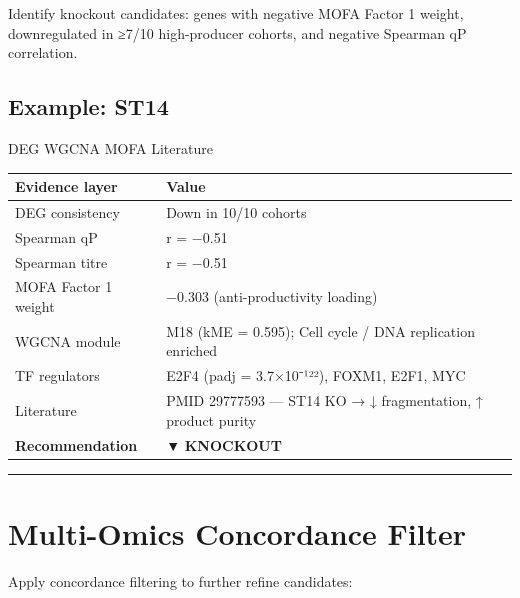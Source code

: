 \documentclass[
  letterpaper,
  oneside,
  open=any]{scrbook}
\newcounter{none} %
\begin{document}
Identify knockout candidates: genes with negative MOFA Factor 1 weight,
downregulated in ≥7/10 high-producer cohorts, and negative Spearman qP
correlation.

\subsection{Example: ST14}\label{example-st14}

{DEG} {WGCNA} {MOFA} {Literature}

{\def\LTcaptype{none} %
\begin{longtable}[]{@{}
  >{\raggedright\arraybackslash}p{}
  >{\raggedright\arraybackslash}p{}@{}}
\toprule\noalign{}
\begin{minipage}[b]{\linewidth}\raggedright
Evidence layer
\end{minipage} & \begin{minipage}[b]{\linewidth}\raggedright
Value
\end{minipage} \\
\midrule\noalign{}
\endhead
\bottomrule\noalign{}
\endlastfoot
DEG consistency & Down in 10/10 cohorts \\
Spearman qP & r = −0.51 \\
Spearman titre & r = −0.51 \\
MOFA Factor 1 weight & −0.303 (anti-productivity loading) \\
WGCNA module & M18 (kME = 0.595); Cell cycle / DNA replication
enriched \\
TF regulators & E2F4 (padj = 3.7×10⁻¹²²), FOXM1, E2F1, MYC \\
Literature & PMID 29777593 --- ST14 KO → ↓ fragmentation, ↑ product
purity \\
\textbf{Recommendation} & ▼ \textbf{KNOCKOUT} \\
\end{longtable}
}

\begin{center}\rule{0.5\linewidth}{0.5pt}\end{center}

\section{Multi-Omics Concordance
Filter}\label{multi-omics-concordance-filter}

Apply concordance filtering to further refine candidates:
\end{document}
